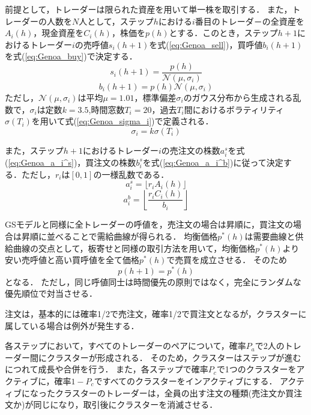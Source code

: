 \documentclass[titlepage]{jsreport}
\begin{document}
前提として，トレーダーは限られた資産を用いて単一株を取引する．
また，トレーダーの人数を$N$人として，ステップ$h$における$i$番目のトレーダ－の全資産を$A_i(h)$，現金資産を$C_i(h)$，株価を$p(h)$とする．このとき，ステップ$h + 1$におけるトレーダー$i$の売呼値$s_i(h + 1)$を式(\ref{eq:Genoa_sell})，買呼値$b_i(h + 1)$を式(\ref{eq:Genoa_buy})で決定する．
\begin{equation}
    s_i(h + 1) = \frac{p(h)}{\mathcal{N}(\mu, \sigma_i)} \label{eq:Genoa_sell}
\end{equation}
\begin{equation}
    b_i(h + 1) = p(h) \mathcal{N}(\mu, \sigma_i) \label{eq:Genoa_buy}
\end{equation}
ただし，$\mathcal{N}(\mu, \sigma_i)$は平均$\mu = 1.01$，標準偏差$\sigma_i$のガウス分布から生成される乱数で，$\sigma_i$は定数$k = 3.5$,時間窓数$T_i = 20$，過去$T_i$間におけるボラティリティ$\sigma(T_i)$を用いて式(\ref{eq:Genoa_sigma_i})で定義される．
\begin{equation}
    \sigma_i = k \sigma(T_i) \label{eq:Genoa_sigma_i}
\end{equation}

また，ステップ$h + 1$におけるトレーダー$i$の売注文の株数$a_i^s$を式(\ref{eq:Genoa_a_i^s})，買注文の株数$b_i^s$を式(\ref{eq:Genoa_a_i^b})に従って決定する．ただし，$r_i$は$[0, 1]$の一様乱数である．
\begin{equation}
    a_i^s = \lfloor r_i A_i(h) \rfloor \label{eq:Genoa_a_i^s}
\end{equation}
\begin{equation}
    a_i^b = \left\lfloor \frac{r_i C_i(h)}{b_i} \right\rfloor \label{eq:Genoa_a_i^b}
\end{equation}

GSモデルと同様に全トレーダーの呼値を，売注文の場合は昇順に，買注文の場合は昇順に並べることで需給曲線が得られる．
均衡価格$p^*(h)$は需要曲線と供給曲線の交点として，板寄せと同様の取引方法を用いて，均衡価格$p^*(h)$より安い売呼値と高い買呼値を全て価格$p^*(h)$で売買を成立させる．
そのため
\begin{equation}
    p(h + 1) = p^*(h) \label{eq:Genoa_price}
\end{equation}
となる．
ただし，同じ呼値同士は時間優先の原則ではなく，完全にランダムな優先順位で対当させる．

注文は，基本的には確率1/2で売注文，確率1/2で買注文となるが，クラスターに属している場合は例外が発生する．

各ステップにおいて，すべてのトレーダーのペアについて，確率$P_a$で2人のトレーダー間にクラスターが形成される．
そのため，クラスターはステップが進むにつれて成長や合併を行う．
また，各ステップで確率$P_c$で1つのクラスターをアクティブに，確率$1 - P_c$ですべてのクラスターをインアクティブにする．
アクティブになったクラスターのトレーダーは，全員の出す注文の種類(売注文か買注文か)が同じになり，取引後にクラスターを消滅させる．
\end{document}
